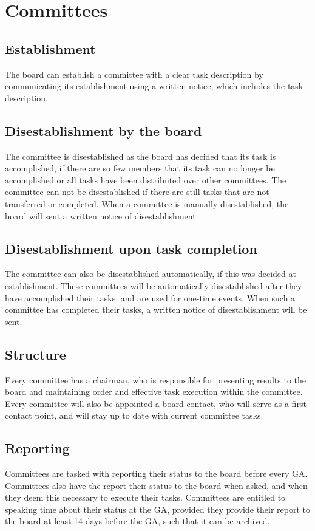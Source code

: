 \documentclass[a4paper]{article}
\begin{document}
\section{Committees}
\subsection{Establishment}
The board can establish a committee with a clear task description by communicating its establishment using a written notice, which includes the task description.

\subsection{Disestablishment by the board}
The committee is disestablished as the board has decided that its task is accomplished, if there are so few members that its task can no longer be accomplished or all tasks have been distributed over other committees. The committee can not be disestablished if there are still tasks that are not transferred or completed. When a committee is manually disestablished, the board will sent a written notice of disestablishment.

\subsection{Disestablishment upon task completion}
The committee can also be disestablished automatically, if this was decided at establishment. These committees will be automatically disestablished after they have accomplished their tasks, and are used for one-time events. When such a committee has completed their tasks, a written notice of disestablishment will be sent.

\subsection{Structure}
Every committee has a chairman, who is responsible for presenting results to the board and maintaining order and effective task execution within the committee. Every committee will also be appointed a board contact, who will serve as a first contact point, and will stay up to date with current committee tasks.

\subsection{Reporting}
Committees are tasked with reporting their status to the board before every GA. Committees also have the report their status to the board when asked, and when they deem this necessary to execute their tasks. Committees are entitled to speaking time about their status at the GA, provided they provide their report to the board at least 14 days before the GA, such that it can be archived.
\end{document}
